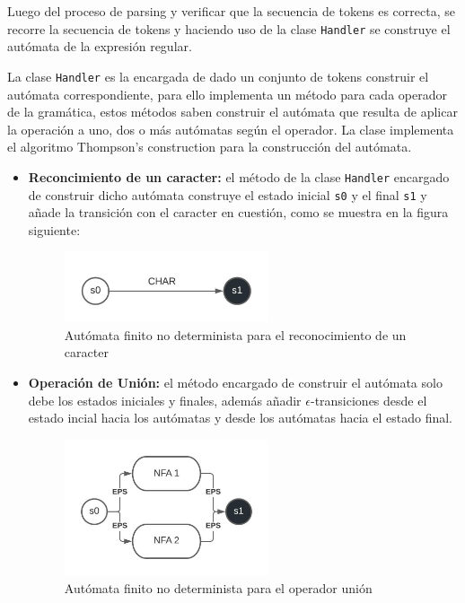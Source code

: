 Luego del proceso de parsing y verificar que la secuencia de tokens es correcta, se recorre la secuencia de tokens y haciendo uso de la clase \verb|Handler| se construye el autómata de la expresión regular. 

La clase \verb|Handler| es la encargada de dado un conjunto de tokens construir el autómata correspondiente, para ello implementa un método para cada operador de la gramática, estos métodos saben construir el autómata que resulta de aplicar la operación a uno, dos o más autómatas según el operador. La clase implementa el algoritmo Thompson's construction para la construcción del autómata.

\begin{itemize}
        \item \textbf{Reconcimiento de un caracter:} el método de la clase \verb|Handler| encargado de construir dicho autómata construye el estado inicial \verb|s0| y el final \verb|s1| y añade la transición con el caracter en cuestión, como se muestra en la figura siguiente:
                \begin{figure}
                        \centering
                        \includegraphics[width=6cm]{./chapters/img/char.jpeg}
                        \caption{Autómata finito no determinista para el reconocimiento de un caracter}
                \end{figure}
        \item \textbf{Operación de Unión:} el método encargado de construir el autómata solo debe los estados iniciales y finales, además añadir $\epsilon$-transiciones desde el estado incial hacia los autómatas y desde los autómatas hacia el estado final.
                \begin{figure}
                        \centering
                        \includegraphics[width=6cm]{./chapters/img/alt.jpeg}
                        \caption{Autómata finito no determinista para el operador unión}

\end{figure}
\end{itemize}
